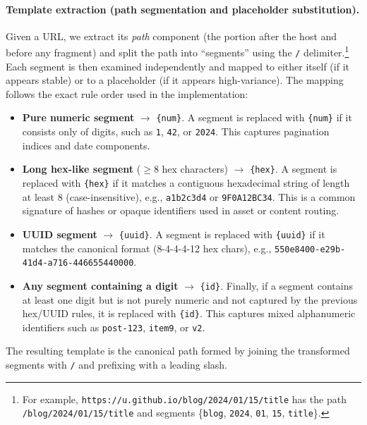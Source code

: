 \paragraph{Template extraction (path segmentation and placeholder substitution).}
Given a URL, we extract its \emph{path} component (the portion after the host and before any fragment) and split the path into ``segments'' using the \texttt{/} delimiter.\footnote{For example, \texttt{https://u.github.io/blog/2024/01/15/title} has the path \texttt{/blog/2024/01/15/title} and segments \{\texttt{blog}, \texttt{2024}, \texttt{01}, \texttt{15}, \texttt{title}\}.}
Each segment is then examined independently and mapped to either itself (if it appears stable) or to a placeholder (if it appears high-variance). The mapping follows the exact rule order used in the implementation:
\begin{itemize}
    \item \textbf{Pure numeric segment} $\rightarrow$ \texttt{\{num\}}.  
    A segment is replaced with \texttt{\{num\}} if it consists only of digits, such as \texttt{1}, \texttt{42}, or \texttt{2024}. This captures pagination indices and date components.
    
    \item \textbf{Long hex-like segment} ($\ge 8$ hex characters) $\rightarrow$ \texttt{\{hex\}}.  
    A segment is replaced with \texttt{\{hex\}} if it matches a contiguous hexadecimal string of length at least 8 (case-insensitive), e.g., \texttt{a1b2c3d4} or \texttt{9F0A12BC34}. This is a common signature of hashes or opaque identifiers used in asset or content routing.

    \item \textbf{UUID segment} $\rightarrow$ \texttt{\{uuid\}}.  
    A segment is replaced with \texttt{\{uuid\}} if it matches the canonical format (8-4-4-4-12 hex chars), e.g., \texttt{550e8400-e29b-41d4-a716-446655440000}.

    \item \textbf{Any segment containing a digit} $\rightarrow$ \texttt{\{id\}}.  
    Finally, if a segment contains at least one digit but is not purely numeric and not captured by the previous hex/UUID rules, it is replaced with \texttt{\{id\}}. This captures mixed alphanumeric identifiers such as \texttt{post-123}, \texttt{item9}, or \texttt{v2}.
\end{itemize}

\noindent The resulting template is the canonical path formed by joining the transformed segments with \texttt{/} and prefixing with a leading slash.

